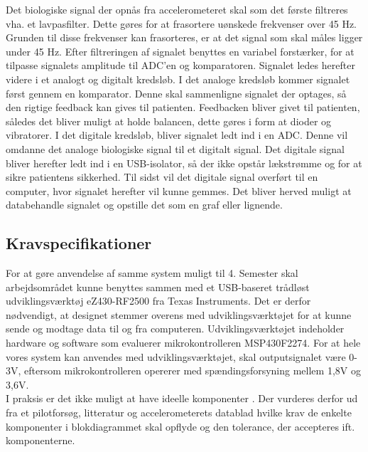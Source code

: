 Det biologiske signal der opnås fra accelerometeret skal som det første filtreres vha. et lavpasfilter. Dette gøres for at frasortere uønskede frekvenser  over 45 Hz. Grunden til disse frekvenser kan frasorteres, er at det signal som skal måles ligger under 45 Hz. Efter filtreringen af signalet benyttes en variabel forstærker, for at tilpasse signalets amplitude til ADC’en og komparatoren. Signalet ledes herefter videre i et analogt og digitalt kredsløb. I det analoge kredsløb kommer signalet først gennem en komparator. Denne skal sammenligne signalet der optages, så den rigtige feedback kan gives til patienten. Feedbacken bliver givet til patienten, således det bliver muligt at holde balancen, dette gøres i form at dioder og vibratorer. I det digitale kredsløb, bliver signalet ledt ind i en ADC. Denne vil omdanne det analoge biologiske signal til et digitalt signal. Det digitale signal bliver herefter ledt ind i en USB-isolator, så der ikke opstår lækstrømme og for at sikre patientens sikkerhed. Til sidst vil det digitale signal overført til en computer, hvor signalet herefter vil kunne gemmes. Det bliver herved muligt at databehandle signalet og opstille det som en graf eller lignende.

\subsection{Kravspecifikationer}
For at gøre anvendelse af samme system muligt til 4. Semester skal arbejdsområdet kunne benyttes sammen med et USB-baseret trådløst udviklingsværktøj eZ430-RF2500 fra Texas Instruments. Det er derfor nødvendigt, at designet stemmer overens med udviklingsværktøjet for at kunne sende og modtage data til og fra computeren. Udviklingsværktøjet indeholder hardware og software som evaluerer mikrokontrolleren MSP430F2274. For at hele vores system kan anvendes med udviklingsværktøjet, skal outputsignalet være 0-3V, eftersom mikrokontrolleren opererer med spændingsforsyning mellem 1,8V og 3,6V. \\
I praksis er det ikke muligt at have ideelle komponenter . Der vurderes derfor ud fra et pilotforsøg, litteratur og accelerometerets datablad hvilke krav de enkelte komponenter i blokdiagrammet skal opflyde og den tolerance, der accepteres ift. komponenterne. 

